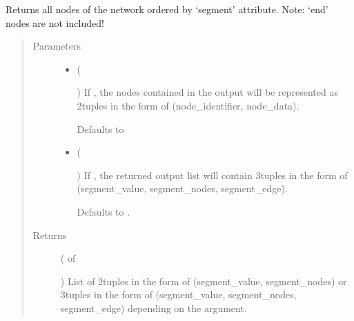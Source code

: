 \documentclass[letterpaper,10pt,english]{sphinxmanual}
\begin{document}
\begin{fulllineitems}
\begin{fulllineitems}
\label{\detokenize{cockatoo:cockatoo.KnitNetwork.all_nodes_by_segment}}
Returns all nodes of the network ordered by ‘segment’ attribute.
Note: ‘end’ nodes are not included!
\begin{quote}\begin{description}
\item[{Parameters}] \leavevmode\begin{itemize}
\item {} 
 (%
\begin{footnote}[110]\sphinxAtStartFootnote
{}
%
\end{footnote}\sphinxstyleliteralemphasis{\sphinxupquote{, }}) \textendash{} 
If , the nodes contained in the output will be represented
as 2\sphinxhyphen{}tuples in the form of (node\_identifier, node\_data).

Defaults to 


\item {} 
 (%
\begin{footnote}[111]\sphinxAtStartFootnote
{}
%
\end{footnote}\sphinxstyleliteralemphasis{\sphinxupquote{, }}) \textendash{} 
If , the returned output list will contain 3\sphinxhyphen{}tuples in the
form of (segment\_value, segment\_nodes, segment\_edge).

Defaults to .


\end{itemize}

\item[{Returns}] \leavevmode
{} ( of %
\begin{footnote}[112]\sphinxAtStartFootnote
{}
%
\end{footnote}) \textendash{} List of 2\sphinxhyphen{}tuples in the form of (segment\_value, segment\_nodes) or
3\sphinxhyphen{}tuples in the form of (segment\_value, segment\_nodes,
segment\_edge) depending on the  argument.


\end{description}
\end{quote}
\end{fulllineitems}
\end{fulllineitems}
\end{document}
